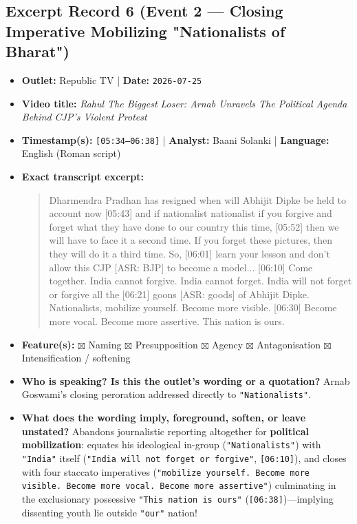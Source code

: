 \documentclass[10pt,a4paper]{article}
\begin{document}
\subsection*{Excerpt Record 6 (Event 2 --- Closing Imperative Mobilizing "Nationalists of Bharat")}
\begin{itemize}[leftmargin=1.5em, itemsep=3pt, topsep=4pt]
  \item \textbf{Outlet:} Republic TV | \textbf{Date:} \texttt{2026-07-25}
  \item \textbf{Video title:} \textit{Rahul The Biggest Loser: Arnab Unravels The Political Agenda Behind CJP's Violent Protest}
  \item \textbf{Timestamp(s):} \texttt{[05:34--06:38]} | \textbf{Analyst:} Baani Solanki | \textbf{Language:} English (Roman script)
  \item \textbf{Exact transcript excerpt:}
    \begin{quote}\small\ttfamily [05:34] Dharmendra Pradhan has resigned when will Abhijit Dipke be held to account now [05:43] and if nationalist nationalist if you forgive and forget what they have done to our country this time, [05:52] then we will have to face it a second time. If you forget these pictures, then they will do it a third time. So, [06:01] learn your lesson and don't allow this CJP [ASR: BJP] to become a model... [06:10] Come together. India cannot forgive. India cannot forget. India will not forget or forgive all the [06:21] goons [ASR: goods] of Abhijit Dipke. Nationalists, mobilize yourself. Become more visible. [06:30] Become more vocal. Become more assertive. This nation is ours.\end{quote}
  \item \textbf{Feature(s):} $\boxtimes$ Naming $\boxtimes$ Presupposition $\boxtimes$ Agency $\boxtimes$ Antagonisation $\boxtimes$ Intensification / softening
  \item \textbf{Who is speaking? Is this the outlet's wording or a quotation?} Arnab Goswami's closing peroration addressed directly to \texttt{"Nationalists"}.
  \item \textbf{What does the wording imply, foreground, soften, or leave unstated?} Abandons journalistic reporting altogether for \textbf{political mobilization}: equates his ideological in-group (\texttt{"Nationalists"}) with \texttt{"India"} itself (\texttt{"India will not forget or forgive"}, \texttt{[06:10]}), and closes with four staccato imperatives (\texttt{"mobilize yourself. Become more visible. Become more vocal. Become more assertive"}) culminating in the exclusionary possessive \texttt{"This nation is ours"} (\texttt{[06:38]})---implying dissenting youth lie outside \texttt{"our"} nation!

\end{itemize}
\end{document}
